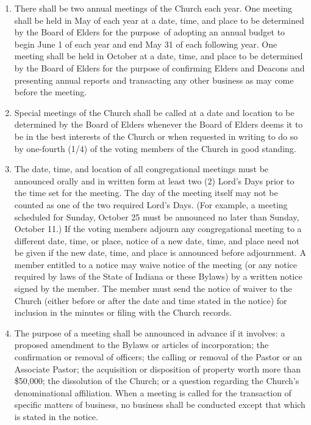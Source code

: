 \documentclass[
]{book}
\begin{document}
\begin{enumerate}
\def\labelenumi{\alph{enumi}.}
\item
  There shall be two annual meetings of the Church each year. One meeting shall be held in May of each year at a date, time, and place to be determined by the Board of Elders for the purpose~of adopting an annual budget to begin June 1 of each year and end May 31 of each following year. One meeting shall be held in October at a date, time, and place to be determined by the Board of Elders for the purpose of confirming Elders and Deacons and presenting annual reports and transacting any other business as may come before the meeting.
\item
  Special meetings of the Church shall be called at a date and location to be determined by the Board of Elders whenever the Board of Elders deems it to be in the best interests of the Church or when requested in writing to do so by one-fourth (1/4) of the voting members of the Church in good standing.
\item
  The date, time, and location of all congregational meetings must be announced orally and in written form at least two (2) Lord's Days prior to the time set for the meeting. The day of the meeting itself may not be counted as one of the two required Lord's Days. (For example, a meeting scheduled for Sunday, October 25 must be announced no later than Sunday, October 11.) If the voting members adjourn any congregational meeting to a different date, time, or place, notice of a new date, time, and place need not be given if the new date, time, and place is announced before adjournment. A member entitled to a notice may waive notice of the meeting (or any notice required by laws of the State of Indiana or these Bylaws) by a written notice signed by the member. The member must send the notice of waiver to the Church (either before or after the date and time stated in the notice) for inclusion in the minutes or filing with the Church records.
\item
  The purpose of a meeting shall be announced in advance if it involves: a proposed amendment to the Bylaws or articles of incorporation; the confirmation or removal of officers; the calling or removal of the Pastor or an Associate Pastor; the acquisition or disposition of property worth more than \$50,000; the dissolution of the Church; or a question regarding the Church's denominational affiliation. When a meeting is called for the transaction of specific matters of business, no business shall be conducted except that which is stated in the notice.

\end{enumerate}
\end{document}
